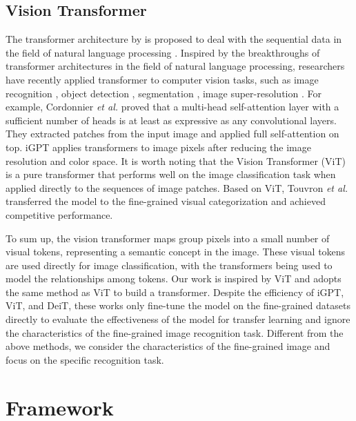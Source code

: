 \documentclass[5p,twocolumn]{elsarticle}
\begin{document}
 


\subsection{Vision Transformer}

The transformer architecture by \cite{Vaswani2017Attention} is proposed to deal with the sequential data in the field of natural language processing \cite{Devlin2019BERT, Brown2020Language}. Inspired by the breakthroughs of transformer architectures in the field of natural language processing, researchers have recently applied transformer to computer vision tasks, such as image recognition \cite{Dosovitskiy2021Image, Touvron2020Training}, object detection \cite{Carion2020End, Zhu2020Deformable}, segmentation \cite{Ye2019Cross}, image super-resolution \cite{yang2020learning}. For example, Cordonnier \textit{et al.} \cite{Cordonnier2020Relationship} proved that a multi-head self-attention layer with a sufficient number of heads is at least as expressive as any convolutional layers. They extracted patches from the input image and applied full self-attention on top. 
iGPT \cite{Chen2020Generative} applies transformers to image pixels after reducing the image resolution and color space.
It is worth noting that the Vision Transformer (ViT) \cite{Dosovitskiy2021Image} is a pure transformer that performs well on the image classification task when applied directly to the sequences of image patches. Based on ViT, Touvron \textit{et al.}\cite{Touvron2020Training} transferred the model to the fine-grained visual categorization and achieved competitive performance. 

To sum up, the vision transformer maps group pixels into a small number of visual tokens, representing a semantic concept in the image. These visual tokens are used directly for image classification, with the transformers being used to model the relationships among tokens. Our work is inspired by ViT and adopts the same method as ViT to build a transformer. Despite the efficiency of iGPT, ViT, and DeiT, these works only fine-tune the model on the fine-grained datasets directly to evaluate the effectiveness of the model for transfer learning and ignore the characteristics of the fine-grained image recognition task. Different from the above methods, we consider the characteristics of the fine-grained image and focus on the specific recognition task.





\section{Framework} \label{sec.frame}
\end{document}
